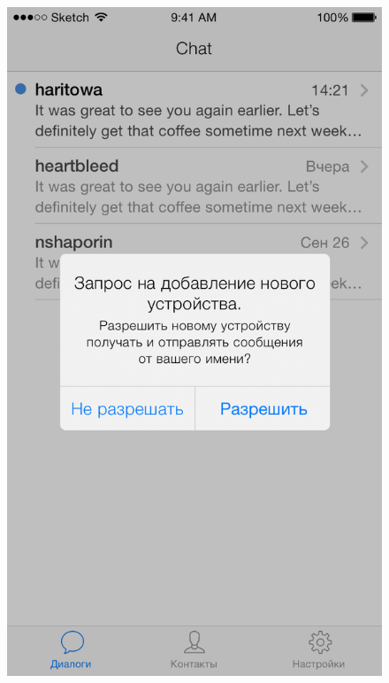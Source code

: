\begin{figure}[H]
\begin{minipage}{.5\textwidth}
  \includegraphics[height=0.25\textheight]{inc/img/ui/add_new_device_notification.png}
  \label{sec:usage:deviceactivation:olddevice}
\end{minipage}
\end{figure}
